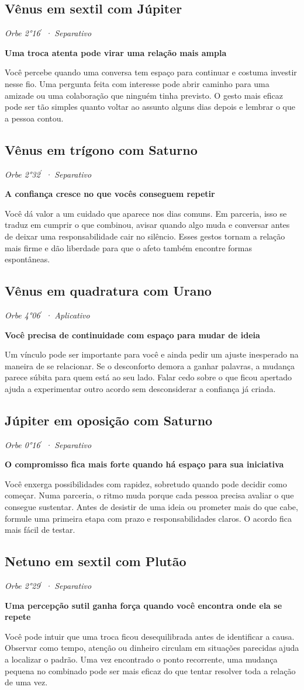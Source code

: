 \documentclass[11pt,a4paper]{article}
\newcommand{\leitura}[3]{\subsection{#1}\textit{#2}\par #3}
\newcommand{\subtituloleitura}[1]{\textbf{#1}\par\nopagebreak[4]}
\begin{document}
\leitura{Vênus em sextil com Júpiter}{Orbe 2°16\ensuremath{^{\prime}} · Separativo}{
\subtituloleitura{Uma troca atenta pode virar uma relação mais ampla}
Você percebe quando uma conversa tem espaço para continuar e costuma investir nesse fio. Uma pergunta feita com interesse pode abrir caminho para uma amizade ou uma colaboração que ninguém tinha previsto. O gesto mais eficaz pode ser tão simples quanto voltar ao assunto alguns dias depois e lembrar o que a pessoa contou.
}

\leitura{Vênus em trígono com Saturno}{Orbe 2°32\ensuremath{^{\prime}} · Separativo}{
\subtituloleitura{A confiança cresce no que vocês conseguem repetir}
Você dá valor a um cuidado que aparece nos dias comuns. Em parceria, isso se traduz em cumprir o que combinou, avisar quando algo muda e conversar antes de deixar uma responsabilidade cair no silêncio. Esses gestos tornam a relação mais firme e dão liberdade para que o afeto também encontre formas espontâneas.
}

\leitura{Vênus em quadratura com Urano}{Orbe 4°06\ensuremath{^{\prime}} · Aplicativo}{
\subtituloleitura{Você precisa de continuidade com espaço para mudar de ideia}
Um vínculo pode ser importante para você e ainda pedir um ajuste inesperado na maneira de se relacionar. Se o desconforto demora a ganhar palavras, a mudança parece súbita para quem está ao seu lado. Falar cedo sobre o que ficou apertado ajuda a experimentar outro acordo sem desconsiderar a confiança já criada.
}

\leitura{Júpiter em oposição com Saturno}{Orbe 0°16\ensuremath{^{\prime}} · Separativo}{
\subtituloleitura{O compromisso fica mais forte quando há espaço para sua iniciativa}
Você enxerga possibilidades com rapidez, sobretudo quando pode decidir como começar. Numa parceria, o ritmo muda porque cada pessoa precisa avaliar o que consegue sustentar. Antes de desistir de uma ideia ou prometer mais do que cabe, formule uma primeira etapa com prazo e responsabilidades claros. O acordo fica mais fácil de testar.
}

\leitura{Netuno em sextil com Plutão}{Orbe 2°29\ensuremath{^{\prime}} · Separativo}{
\subtituloleitura{Uma percepção sutil ganha força quando você encontra onde ela se repete}
Você pode intuir que uma troca ficou desequilibrada antes de identificar a causa. Observar como tempo, atenção ou dinheiro circulam em situações parecidas ajuda a localizar o padrão. Uma vez encontrado o ponto recorrente, uma mudança pequena no combinado pode ser mais eficaz do que tentar resolver toda a relação de uma vez.
}
\end{document}
